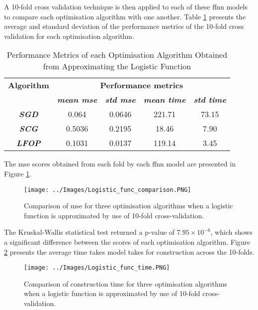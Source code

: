 \documentclass[10pt, conference]{IEEEtran}
\begin{document}
A 10-fold cross validation technique is then applied to each of these \acrshort{ffnn} models to compare each
optimisation algorithm with one another. Table \ref{table: Logistic_performance_metrics} presents the average
and standard deviation of the performance metrics of the 10-fold cross validation for each optimisation algorithm.
\begin{table}[H]
    \caption{Performance Metrics of each Optimisation Algorithm Obtained from Approximating the Logistic Function}
    \begin{center}
        \begin{tabular}{|c||c|c|c|c|}
            \hline
            \textbf{Algorithm}&\multicolumn{4}{|c|}{\textbf{Performance metrics}} \\
            \cline{2-5}
                        & \textbf{\textit{mean mse}} & \textbf{\textit{std mse}} & \textbf{\textit{mean time}} & \textbf{\textit{std time}}\\
            \hline
            \textbf{\textit{SGD}}  & 0.064 & 0.0646 & 221.71 & 73.15\\
            \textbf{\textit{SCG}}  & 0.5036 & 0.2195 & 18.46 & 7.90\\
            \textbf{\textit{LFOP}} & 0.1031 & 0.0137 & 119.14 & 3.45\\
            \hline
        \end{tabular}
    \end{center}
    \label{table: Logistic_performance_metrics}
\end{table}

The \acrshort{mse} scores obtained from each fold by each \acrshort{ffnn}
model are presented in Figure \ref{fig:Logistic_function_comparison}.
\begin{figure}[H]
    \centerline{\texttt{[image: ../Images/Logistic\_func\_comparison.PNG]}}
    \caption{Comparison of \acrshort{mse} for three optimisation algorithms when a logistic function is approximated by use of 10-fold cross-validation.}
    \label{fig:Logistic_function_comparison}
\end{figure}
The Kruskal-Wallis statistical test returned a p-value of $7.95\times10^{-6}$, which shows a significant
difference between the scores of each optimisation algorithm. Figure \ref{fig:Logistic_function_time}
presents the average time takes model takes for construction across the 10-folds.
\begin{figure}[H]
    \centerline{\texttt{[image: ../Images/Logistic\_func\_time.PNG]}}
    \caption{Comparison of construction time for three optimisation algorithms when a logistic function is approximated by use of 10-fold cross-validation.}
    \label{fig:Logistic_function_time}
\end{figure}
\end{document}
